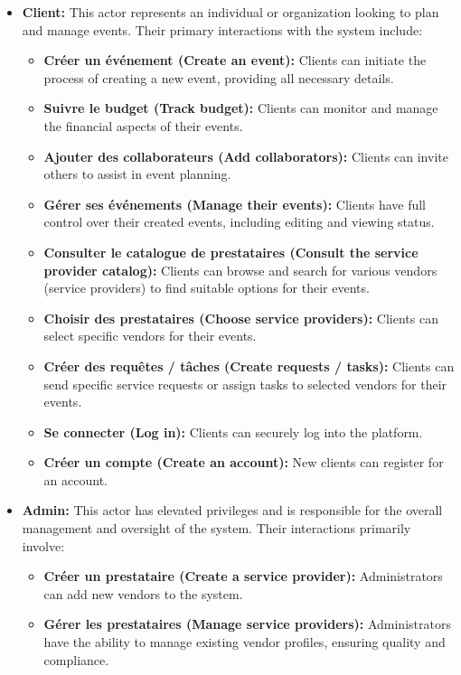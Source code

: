 \documentclass{report}
\begin{document}
\begin{itemize}
    \item \textbf{Client:} This actor represents an individual or organization looking to plan and manage events. Their primary interactions with the system include:
    \begin{itemize}
        \item \textbf{Créer un événement (Create an event):} Clients can initiate the process of creating a new event, providing all necessary details.
        \item \textbf{Suivre le budget (Track budget):} Clients can monitor and manage the financial aspects of their events.
        \item \textbf{Ajouter des collaborateurs (Add collaborators):} Clients can invite others to assist in event planning.
        \item \textbf{Gérer ses événements (Manage their events):} Clients have full control over their created events, including editing and viewing status.
        \item \textbf{Consulter le catalogue de prestataires (Consult the service provider catalog):} Clients can browse and search for various vendors (service providers) to find suitable options for their events.
        \item \textbf{Choisir des prestataires (Choose service providers):} Clients can select specific vendors for their events.
        \item \textbf{Créer des requêtes / tâches (Create requests / tasks):} Clients can send specific service requests or assign tasks to selected vendors for their events.
        \item \textbf{Se connecter (Log in):} Clients can securely log into the platform.
        \item \textbf{Créer un compte (Create an account):} New clients can register for an account.
    \end{itemize}
    \item \textbf{Admin:} This actor has elevated privileges and is responsible for the overall management and oversight of the system. Their interactions primarily involve:
    \begin{itemize}
        \item \textbf{Créer un prestataire (Create a service provider):} Administrators can add new vendors to the system.
        \item \textbf{Gérer les prestataires (Manage service providers):} Administrators have the ability to manage existing vendor profiles, ensuring quality and compliance.

\end{itemize}
\end{itemize}
\end{document}
